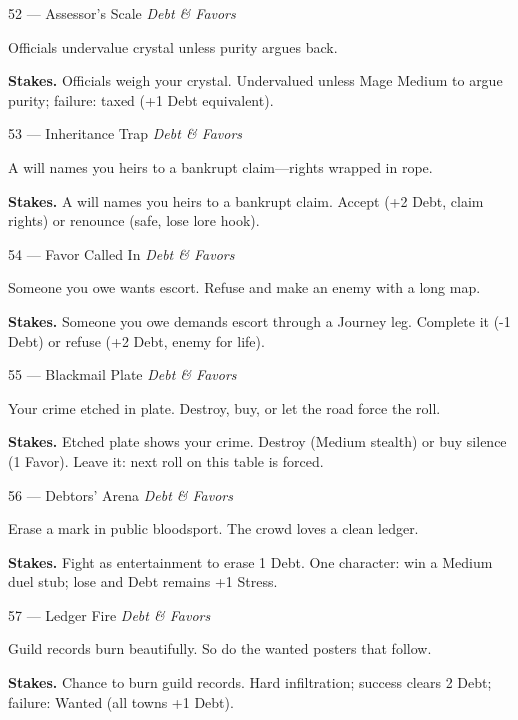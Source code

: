 \begin{encounterentry}{52 --- Assessor's Scale}
\textit{Debt \& Favors}

Officials undervalue crystal unless purity argues back.

\textbf{Stakes.} Officials weigh your crystal. Undervalued unless Mage Medium to argue purity; failure: taxed (+1 Debt equivalent).
\end{encounterentry}

\begin{encounterentry}{53 --- Inheritance Trap}
\textit{Debt \& Favors}

A will names you heirs to a bankrupt claim---rights wrapped in rope.

\textbf{Stakes.} A will names you heirs to a bankrupt claim. Accept (+2 Debt, claim rights) or renounce (safe, lose lore hook).
\end{encounterentry}

\begin{encounterentry}{54 --- Favor Called In}
\textit{Debt \& Favors}

Someone you owe wants escort. Refuse and make an enemy with a long map.

\textbf{Stakes.} Someone you owe demands escort through a Journey leg. Complete it (-1 Debt) or refuse (+2 Debt, enemy for life).
\end{encounterentry}

\begin{encounterentry}{55 --- Blackmail Plate}
\textit{Debt \& Favors}

Your crime etched in plate. Destroy, buy, or let the road force the roll.

\textbf{Stakes.} Etched plate shows your crime. Destroy (Medium stealth) or buy silence (1 Favor). Leave it: next roll on this table is forced.
\end{encounterentry}

\begin{encounterentry}{56 --- Debtors' Arena}
\textit{Debt \& Favors}

Erase a mark in public bloodsport. The crowd loves a clean ledger.

\textbf{Stakes.} Fight as entertainment to erase 1 Debt. One character: win a Medium duel stub; lose and Debt remains +1 Stress.
\end{encounterentry}

\begin{encounterentry}{57 --- Ledger Fire}
\textit{Debt \& Favors}

Guild records burn beautifully. So do the wanted posters that follow.

\textbf{Stakes.} Chance to burn guild records. Hard infiltration; success clears 2 Debt; failure: Wanted (all towns +1 Debt).
\end{encounterentry}

